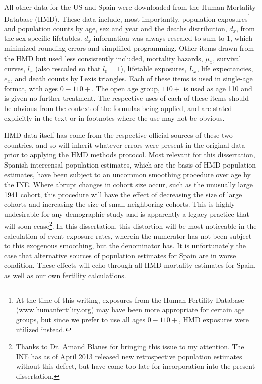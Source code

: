 All other data for the US and Spain were downloaded from the Human Mortality
Database (HMD)\citep{wilmoth2007methods}. These data include, most importantly,
population exposures\footnote{At the time of this writing, exposures from the
Human Fertility Database (\url{www.humanfertility.org}) may have been more
appropriate for certain age groups, but since we prefer to use all ages
$0-110+$, HMD exposures were utilized instead.} and population counts by age,
sex and year and the deaths distribution, $d_x$, from the sex-specific
lifetables. $d_x$ information was always rescaled to sum to 1, which minimized rounding errors and simplified
programming. Other items drawn from the HMD but used less consistently
included, mortality hazards, $\mu_x$, survival curves, $l_x$ (also rescaled so that $l_0 = 1$), 
lifetable exposures, $L_x$,
life expectancies, $e_x$, and death counts by Lexis triangles. Each of these
items is used in single-age format, with ages $0-110+$. The open age group,
$110+$ is used as age 110 and is given no further treatment. The
respective uses of each of these items should be obvious from the context 
of the formulas being applied, and are stated explicitly in the text or in 
footnotes where the use may not be obvious.

HMD data itself has come from the respective official sources of these
two countries, and so will inherit whatever errors were present in the original
data prior to applying the HMD methods protocol. Most relevant for this
dissertation, Spanish intercensal population estimates, which are the basis of
HMD population estimates, have been subject to an uncommon smoothing
procedure over age by the INE. Where abrupt changes in cohort size occur, such
as the unusually large 1941 cohort, this procedure will have the effect of
decreasing the size of large cohorts and increasing the size of small neighboring cohorts. This is
highly undesirable for any demographic study and is apparently a legacy
practice that will soon cease\footnote{Thanks to Dr. Amand Blanes for bringing
this issue to my attention. The INE has as of April 2013 released new
retrospective population estimates without this defect, but have come too
late for incorporation into the present dissertation.}. In this dissertation, this
distortion will be most noticeable in the calculation of event-exposure rates, 
wherein the numerator has not been subject to this exogenous smoothing, but 
the denominator has. It is unfortunately the case that alternative sources of 
population estimates for Spain are in worse condition. These effects will echo through all HMD mortality
estimates for Spain, as well as our own fertility calculations. 

